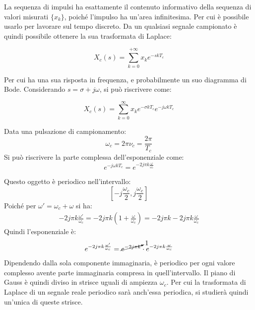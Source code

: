 \documentclass{article}
\numberwithin{equation}{subsection}
\begin{document}
La sequenza di impulsi ha esattamente il contenuto informativo della sequenza di valori misurati $\{x_k\}$, poiché l'impulso ha un'area infinitesima. Per cui è possibile 
usarlo per lavorare sul tempo discreto. Da un qualsiasi segnale campionato è quindi possibile ottenere la sua trasformata di Laplace:

\begin{equation}
    X_c(s)=\sum_{k=0}^{+\infty}\displaystyle{x_k}e^{-skT_c}
\end{equation}

Per cui ha una sua risposta in frequenza, e probabilmente un suo diagramma di Bode. Considerando $s=\sigma +j\omega$, si può riscrivere come: 

\begin{equation}
    X_c(s)=\sum_{k=0}^{\infty}x_ke^{-\sigma kT_c}e^{-j\omega kT_c}
\end{equation}

Data una pulsazione di campionamento:
\begin{equation*}
    \omega_c=2\pi\nu_c=\displaystyle\frac{2\pi}{T_c}
\end{equation*}
Si può riscrivere la parte complessa dell'esponenziale come:
\begin{equation*}
    e^{-j\omega kT_c}=e^{-2j\pi k\frac{\omega}{\omega_c}}
\end{equation*}

Questo oggetto è periodico nell'intervallo:
\begin{equation*}
    \left[\displaystyle-j\frac{\omega_c}{2},j\frac{\omega_c}{2}\right]
\end{equation*}
Poiché per $\omega'=\omega_c+\omega$ si ha:
\begin{gather*}
    -2j\pi k\displaystyle\frac{\omega'}{\omega_c}=-2j\pi k\left(1+\frac{\omega}{\omega_c}\right)=-2j\pi k-2j\pi k\frac{\omega}{\omega_c}
\end{gather*}
Quindi l'esponenziale è:
\begin{gather*}
    e^{-2j\pi k\frac{\omega'}{\omega_c}}=\cancelto{1}{e^{-2j\pi k}}\cdot e^{-2j\pi k\frac{\omega}{\omega_c}}
\end{gather*} 
Dipendendo dalla sola componente immaginaria, è 
periodico per ogni valore complesso avente parte immaginaria compresa in quell'intervallo. Il piano di Gauss è quindi diviso in strisce uguali di ampiezza $\omega_c$. 
Per cui la trasformata di Laplace di un segnale reale periodico sarà anch'essa periodica, si studierà quindi un'unica di queste strisce. 
\end{document}

